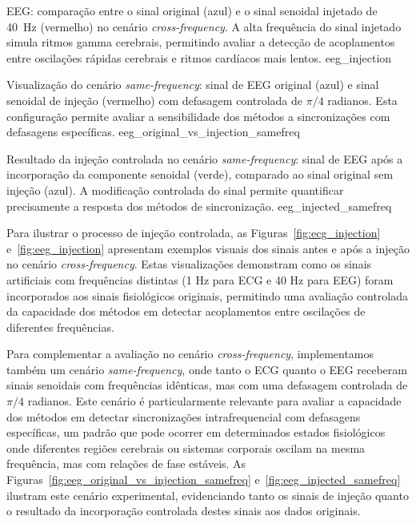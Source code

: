 {EEG: comparação entre o sinal original (azul) e o sinal senoidal injetado de 40~Hz (vermelho) no cenário \textit{cross-frequency}. A alta frequência do sinal injetado simula ritmos gamma cerebrais, permitindo avaliar a detecção de acoplamentos entre oscilações rápidas cerebrais e ritmos cardíacos mais lentos.}
{eeg_injection}

{Visualização do cenário \textit{same-frequency}: sinal de EEG original (azul) e sinal senoidal de injeção (vermelho) com defasagem controlada de \(\pi/4\) radianos. Esta configuração permite avaliar a sensibilidade dos métodos a sincronizações com defasagens específicas.}
{eeg_original_vs_injection_samefreq}

{Resultado da injeção controlada no cenário \textit{same-frequency}: sinal de EEG após a incorporação da componente senoidal (verde), comparado ao sinal original sem injeção (azul). A modificação controlada do sinal permite quantificar precisamente a resposta dos métodos de sincronização.}
{eeg_injected_samefreq}

\clearpage
Para ilustrar o processo de injeção controlada, as Figuras~\ref{fig:ecg_injection} e~\ref{fig:eeg_injection} apresentam exemplos visuais dos sinais antes e após a injeção no cenário \textit{cross-frequency}. Estas visualizações demonstram como os sinais artificiais com frequências distintas (1 Hz para ECG e 40 Hz para EEG) foram incorporados aos sinais fisiológicos originais, permitindo uma avaliação controlada da capacidade dos métodos em detectar acoplamentos entre oscilações de diferentes frequências.

Para complementar a avaliação no cenário \textit{cross-frequency}, implementamos também um cenário \textit{same-frequency}, onde tanto o ECG quanto o EEG receberam sinais senoidais com frequências idênticas, mas com uma defasagem controlada de \(\pi/4\) radianos. Este cenário é particularmente relevante para avaliar a capacidade dos métodos em detectar sincronizações intrafrequencial com defasagens específicas, um padrão que pode ocorrer em determinados estados fisiológicos onde diferentes regiões cerebrais ou sistemas corporais oscilam na mesma frequência, mas com relações de fase estáveis. As Figuras~\ref{fig:eeg_original_vs_injection_samefreq} e~\ref{fig:eeg_injected_samefreq} ilustram este cenário experimental, evidenciando tanto os sinais de injeção quanto o resultado da incorporação controlada destes sinais aos dados originais.

